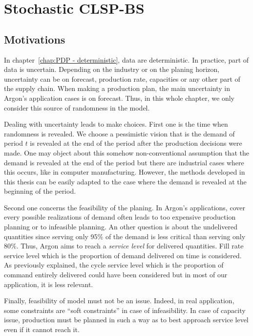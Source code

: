 \chapter{Stochastic CLSP-BS}


\section{Motivations}




In chapter~\ref{chap:PDP - deterministic}, data are deterministic. In practice, part of data is uncertain. Depending on the industry or on the planing horizon, uncertainty can be on forecast, production rate, capacities or any other part of the supply chain. When making a production plan, the main uncertainty in Argon's application cases is on forecast. Thus, in this whole chapter, we only consider this source of randomness in the model.


Dealing with uncertainty leads to make choices. First one is the time when randomness is revealed. We choose a pessimistic vision that is the demand of period $t$ is revealed at the end of the period after the production decisions were made. One may object about this somehow non-conventional assumption that the demand is revealed at the end of the period but there are industrial cases where this occurs, like in computer manufacturing. However, the methods developed in this thesis can be easily adapted to the case where the demand is revealed at the beginning of the period.


Second one concerns the feasibility of the planing. In Argon's applications, cover every possible realizations of demand often leads to too expensive production planning or to infeasible planning. An other question is about the undelivered quantities since serving only 95\% of the demand is less critical than serving only 80\%. Thus, Argon aims to reach a \emph{service level} for delivered quantities. Fill rate service level which is the proportion of demand delivered on time is considered. As previously explained, the cycle service level which is the proportion of command entirely delivered could have been considered but in most of our application, it is less relevant.


Finally, feasibility of model must not be an issue. Indeed, in real application, some constraints are ``soft constraints'' in case of infeasibility. In case of capacity issue, production must be planned in such a way as to best approach service level even if it cannot reach it.


